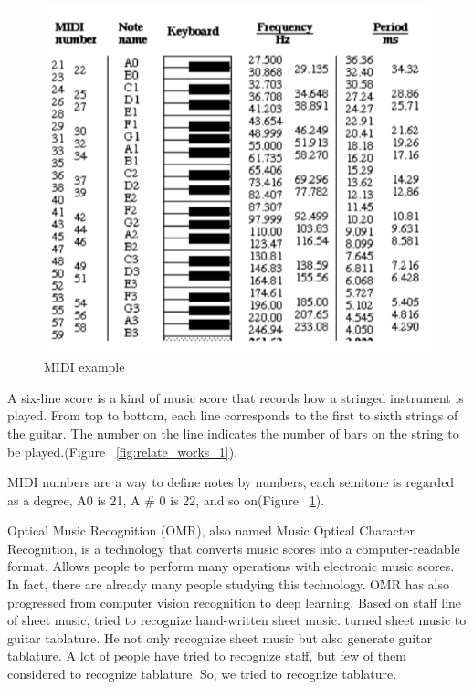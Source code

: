 \documentclass[10pt,twocolumn,letterpaper]{article}
\begin{document}
\begin{CJK}{UTF8}{bsmi}
\begin{figure}[t]
\begin{center}
   \includegraphics[width=0.8\linewidth]{relate_works_2.png}
\end{center}
   \caption{MIDI example}
\label{fig:relate_works_2}
\end{figure}

A six-line score is a kind of music score that records how a stringed instrument is played. From top to bottom, each line corresponds to the first to sixth strings of the guitar. The number on the line indicates the number of bars on the string to be played.(Figure ~\ref{fig:relate_works_1}).

MIDI numbers are a way to define notes by numbers, each semitone is regarded as a degree, A0 is 21, A \# 0 is 22, and so on(Figure ~\ref{fig:relate_works_2}).

Optical Music Recognition (OMR), also named Music Optical Character Recognition, is a technology that converts music scores into a computer-readable format\cite{omr_survey}. Allows people to perform many operations with electronic music scores. In fact, there are already many people studying this technology. OMR has also progressed from computer vision recognition to deep learning.
Based on staff line of sheet music, \cite{staff_detection} tried to recognize hand-written sheet music.
\cite{expert_system} turned sheet music to guitar tablature. He not only recognize sheet music but also generate guitar tablature. 
A lot of people have tried to recognize staff, but few of them considered to recognize tablature.
So, we tried to recognize tablature.



\end{CJK}
\end{document}
